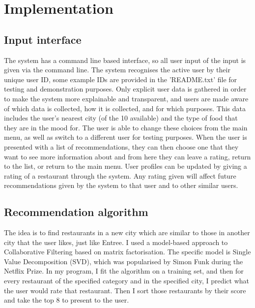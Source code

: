 \documentclass[conference]{IEEEtran}
\begin{document}
\section{Implementation}

\subsection{Input interface}
The system has a command line based interface, so all user input of the input is given via the command line. 
The system recognises the active user by their unique user ID, some example IDs are provided in the 'README.txt' 
file for testing and demonstration purposes. 
Only explicit user data is gathered in order to make the system more explainable and transparent, 
and users are made aware of which data is collected, how it is collected, and for which purposes. 
This data includes the user's nearest city (of the 10 available) and the type of food that 
they are in the mood for. 
The user is able to change these choices from the main menu, as well as switch to a different user 
for testing purposes. 
When the user is presented with a list of recommendations, they can then choose one that they want 
to see more information about and from here they can leave a rating, return to the list, or return to 
the main menu. 
User profiles can be updated by giving a rating of a restaurant through the system. 
Any rating given will affect future recommendations given by the system to that user 
and to other similar users. 

\subsection{Recommendation algorithm}
The idea is to find restaurants in a new city which are similar to those in another city that the user likes, just like Entree. 
I used a model-based approach to Collaborative Filtering based on matrix factorisation. 
The specific model is Single Value Decomposition (SVD), which was popularised by Simon Funk during the Netflix Prize. 
In my program, I fit the algorithm on a training set, and then for every restaurant of the specified category 
and in the specified city, I predict what the user would rate that restaurant. 
Then I sort those restaurants by their score and take the top 8 to present to the user. 
\end{document}
